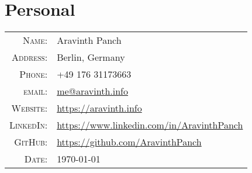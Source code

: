 \section{Personal}
\begin{tabular}
	{rl}
	\textsc{Name:} &  Aravinth Panch \\
	\textsc{Address:} & Berlin, Germany\\
	\textsc{Phone:} & +49 176 31173663\\
	\textsc{email:} & \href{mailto:me@aravinth.info}{me@aravinth.info} \\
	\textsc{Website:} & \href{https://aravinth.info}{https://aravinth.info} \\
	\textsc{LinkedIn:} & \href{https://www.linkedin.com/in/AravinthPanch}{https://www.linkedin.com/in/AravinthPanch} \\
	\textsc{GitHub:} & \href{https://github.com/AravinthPanch}{https://github.com/AravinthPanch} \\
	\textsc{Date:} & \today\\
\end{tabular}
